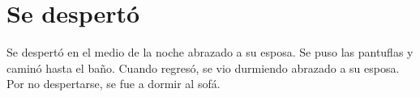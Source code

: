 \documentclass[11pt,twoside,openright,a6paper]{book}
\begin{document}
\chapter*{Se despertó}

Se despertó en el medio de la noche abrazado a su esposa. Se puso las pantuflas y caminó hasta el baño. Cuando regresó, se vio durmiendo abrazado a su esposa. Por no despertarse, se fue a dormir al sofá.

\newpage
\thispagestyle{empty}
\mbox{}



\end{document}
